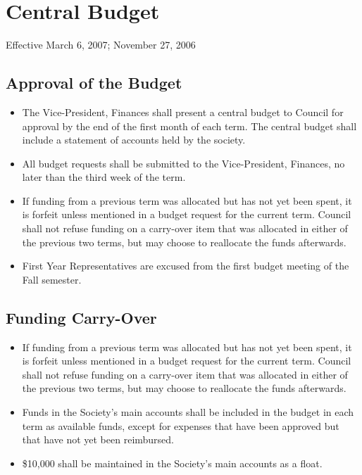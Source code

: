\section{Central Budget}
Effective March 6, 2007; November 27, 2006

\subsection{Approval of the Budget}
\begin{itemize}
\item The Vice-President, Finances shall present a central budget to Council for approval by the end of the first month of each term. The central budget shall include a statement of accounts held by the society.
\item All budget requests shall be submitted to the Vice-President, Finances, no later than the third week of the term.
\item If funding from a previous term was allocated but has not yet been spent, it is forfeit unless mentioned in a budget request for the current term. Council shall not refuse funding on a carry-over item that was allocated in either of the previous two terms, but may choose to reallocate the funds afterwards.
\item First Year Representatives are excused from the first budget meeting of the Fall semester.
\end{itemize}


\subsection{Funding Carry-Over}
\begin{itemize}
\item If funding from a previous term was allocated but has not yet been spent, it is forfeit unless mentioned in a budget request for the current term. Council shall not refuse funding on a carry-over item that was allocated in either of the previous two terms, but may choose to reallocate the funds afterwards.
\item Funds in the Society's main accounts shall be included in the budget in each term as available funds, except for expenses that have been approved but that have not yet been reimbursed.
\item \$10,000 shall be maintained in the Society's main accounts as a float.
\end{itemize}

